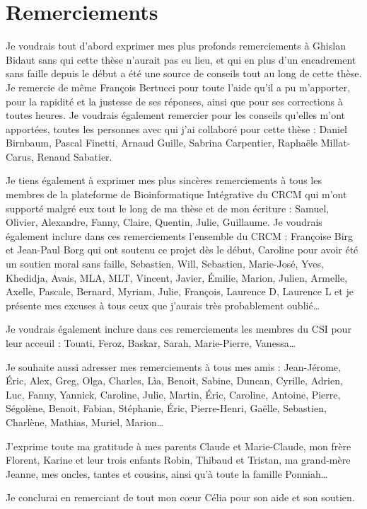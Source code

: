 \chapter*{Remerciements}

\noindent{}Je voudrais tout d'abord exprimer mes plus profonds remerciements à Ghislan Bidaut sans qui cette thèse n'aurait pas eu lieu, et qui en plus d'un encadrement sans faille depuis le début a été une source de conseils tout au long de cette thèse. Je remercie de même François Bertucci pour toute l'aide qu'il a pu m'apporter, pour la rapidité et la justesse de ses réponses, ainsi que pour ses corrections à toutes heures. Je voudrais également remercier pour les conseils qu'elles m'ont apportées, toutes les personnes avec qui j'ai collaboré pour cette thèse : Daniel Birnbaum, Pascal Finetti, Arnaud Guille, Sabrina Carpentier, Raphaële Millat-Carus, Renaud Sabatier.
\vspace{.5cm}

\noindent{}Je tiens également à exprimer mes plus sincères remerciements à tous les membres de la plateforme de Bioinformatique Intégrative du \acs{CRCM} qui m'ont supporté malgré eux tout le long de ma thèse et de mon écriture : Samuel, Olivier, Alexandre, Fanny, Claire, Quentin, Julie, Guillaume. Je voudrais également inclure dans ces remerciements l'ensemble du CRCM : Françoise Birg et Jean-Paul Borg qui ont soutenu ce projet dès le début, Caroline pour avoir été un soutien moral sans faille, Sebastien, Will, Sebastien, Marie-José, Yves, Khedidja, Avais, MLA, MLT, Vincent, Javier, Émilie, Marion, Julien, Armelle, Axelle, Pascale, Bernard, Myriam, Julie, François, Laurence D, Laurence L et je présente mes excuses à tous ceux que j'aurais très probablement oublié\dots
\vspace{.5cm}

\noindent{}Je voudrais également inclure dans ces remerciements les membres du \acs{CSI} pour leur acceuil : Touati, Feroz, Baskar, Sarah, Marie-Pierre, Vanessa\dots
\vspace{.5cm}

\noindent{}Je souhaite aussi adresser mes remerciements à tous mes amis : Jean-Jérome, Éric, Alex, Greg, Olga, Charles, Lìa, Benoit, Sabine, Duncan, Cyrille, Adrien, Luc, Fanny, Yannick, Caroline, Julie, Martin, Éric, Caroline, Antoine, Pierre, Ségolène, Benoit, Fabian, Stéphanie, Éric, Pierre-Henri, Gaëlle, Sebastien, Charlène, Mathias, Muriel, Marion\dots
\vspace{.5cm}

\noindent{}J'exprime toute ma gratitude à mes parents Claude et Marie-Claude, mon frère Florent, Karine et leur trois enfants Robin, Thibaud et Tristan, ma grand-mère Jeanne, mes oncles, tantes et cousins, ainsi qu'à toute la famille Ponniah\dots
\vspace{.5cm}

\noindent{}Je conclurai en remerciant de tout mon c{\oe}ur Célia pour son aide et son soutien.